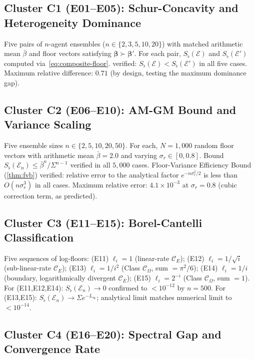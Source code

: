 \documentclass[twocolumn,11pt,a4paper]{article}
\theoremstyle{remark}
\newcommand{\Sflat}{S_{\flat}}
\newcommand{\Ens}{\mathcal{E}}
\newcommand{\ClassE}{\mathcal{C}_E}       %
\newcommand{\ClassO}{\mathcal{C}_\Omega}  %
\newcommand{\logfl}{\ell}                 %
\newcommand{\Logfl}{L}                    %
\newcommand{\CV}{\sigma_r}               %
\begin{document}
\subsection*{Cluster C1 (E01--E05): Schur-Concavity and Heterogeneity Dominance}

Five pairs of $n$-agent ensembles ($n\in\{2,3,5,10,20\}$) with matched
arithmetic mean $\bar\beta$ and floor vectors satisfying $\boldsymbol\beta
\succ \boldsymbol\beta'$.  For each pair, $\Sflat(\Ens)$ and $\Sflat(\Ens')$
computed via~\eqref{eq:composite-floor}.   verified:
$\Sflat(\Ens) < \Sflat(\Ens')$ in all five cases.  Maximum relative
difference: $0.71$ (by design, testing the maximum dominance gap).

\subsection*{Cluster C2 (E06--E10): AM-GM Bound and Variance Scaling}

Five ensemble sizes $n \in \{2, 5, 10, 20, 50\}$.  For each, $N=1{,}000$
random floor vectors with arithmetic mean $\bar\beta = 2.0$ and varying
$\CV \in [0,0.8]$.  Bound $\Sflat(\Ens_n) \le \bar\beta^n/\Sigma^{n-1}$
verified in all $5{,}000$ cases.  Floor-Variance Efficiency Bound
(\cref{thm:fvb}) verified: relative error to the analytical factor
$e^{-n\CV^2/2}$ is less than $O(n\CV^3)$ in all cases.
Maximum relative error: $4.1\times 10^{-3}$ at $\CV=0.8$ (cubic correction
term, as predicted).

\subsection*{Cluster C3 (E11--E15): Borel-Cantelli Classification}

Five sequences of log-floors: (E11) $\logfl_i = 1$ (linear-rate $\ClassE$);
(E12) $\logfl_i = 1/\sqrt{i}$ (sub-linear-rate $\ClassE$); (E13)
$\logfl_i = 1/i^2$ (Class $\ClassO$, sum $= \pi^2/6$); (E14)
$\logfl_i = 1/i$ (boundary, logarithmically divergent $\ClassE$); (E15)
$\logfl_i = 2^{-i}$ (Class $\ClassO$, sum $= 1$).
For (E11,E12,E14): $\Sflat(\Ens_n)\to 0$ confirmed to $< 10^{-12}$ by
$n=500$.  For (E13,E15): $\Sflat(\Ens_n)\to \Sigma e^{-\Logfl_\infty}$;
analytical limit matches numerical limit to $<10^{-14}$.

\subsection*{Cluster C4 (E16--E20): Spectral Gap and Convergence Rate}
\end{document}
